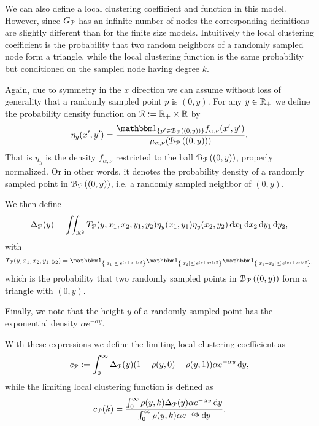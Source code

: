 We can also define a local clustering coefficient and function in this model. However, since $G_{{\mathcal P}}$ has an infinite number of nodes the corresponding definitions are slightly different than for the finite size models. Intuitively the local clustering coefficient is the probability that two random neighbors of a randomly sampled node form a triangle, while the local clustering function is the same probability but conditioned on the sampled node having degree $k$.

Again, due to symmetry in the $x$ direction we can assume without loss of generality that a randomly sampled point $p$ is $(0,y)$. For any $y \in {\ensuremath{\mathbb R}}_+$ we define the probability density function on ${\mathcal R} := {\mathbb R}_+ \times {\ensuremath{\mathbb R}}$ by  
\begin{equation}\label{eq:def_eta_P}
	\eta_y(x^\prime, y^\prime) = \frac{\ind{p^\prime \in \BallPo{(0,y)}} f_{\alpha,\nu}(x^\prime,y^\prime)}{\mu_{\alpha,\nu}(\BallPo{(0,y)})}.
\end{equation}
That is $\eta_y$ is the density $f_{\alpha,\nu}$ restricted to the ball ${\mathcal B}_{{\mathcal P}}\left((0,y)\right)$, properly normalized. Or in other words, it denotes the probability density of a randomly sampled point in ${\mathcal B}_{{\mathcal P}}\left((0,y)\right)$, i.e. a randomly sampled neighbor of $(0,y)$. 

We then define
\begin{equation}\label{eq:def_delta_p}
	\Delta_{{\mathcal P}}(y) = \iint_{{\mathcal R}^2} T_{{\mathcal P}}(y, x_1, x_2, y_1, y_2) \eta_{y}(x_1,y_1)\eta_{y}(x_2,y_2) \operatorname{\mathrm{d}\hspace{-2pt}} x_1 \operatorname{\mathrm{d}\hspace{-2pt}} x_2  \operatorname{\mathrm{d}\hspace{-2pt}} y_1  \operatorname{\mathrm{d}\hspace{-2pt}} y_2,
\end{equation}
with 
\[
	T_\Pcal(y, x_1, x_2, y_1, y_2) 
	= \ind{|x_1| \, \le \, e^{(y+y_1)/2}}\ind{|x_2| \, \le \, e^{(y+y_2)/2}}\ind{|x_1-x_2| \, \le \, e^{(y_1+y_2)/2}},
\]
which is the probability that two randomly sampled points in ${\mathcal B}_{{\mathcal P}}\left((0,y)\right)$ form a triangle with $(0,y)$.

Finally, we note that the height $y$ of a randomly sampled point has the exponential density $\alpha e^{-\alpha y}$.  

With these expressions we define the limiting local clustering coefficient as
\begin{equation}\label{eq:def_average_clustering_infinite_model}
	c_{{\mathcal P}} := \int_0^\infty \Delta_{{\mathcal P}}(y) (1 - \rho(y,0) - \rho(y,1)) \alpha e^{-\alpha y} \operatorname{\mathrm{d}\hspace{-2pt}} y,
\end{equation}
while the limiting local clustering function is defined as
\begin{equation}\label{eq:def_c_infty_k}
	c_{{\mathcal P}}(k) = \frac{\int_0^\infty \rho(y,k) \Delta_{{\mathcal P}}(y) \alpha e^{-\alpha y} \operatorname{\mathrm{d}\hspace{-2pt}} y}{\int_0^\infty \rho(y,k) \alpha e^{-\alpha y} \operatorname{\mathrm{d}\hspace{-2pt}} y}.
\end{equation}

